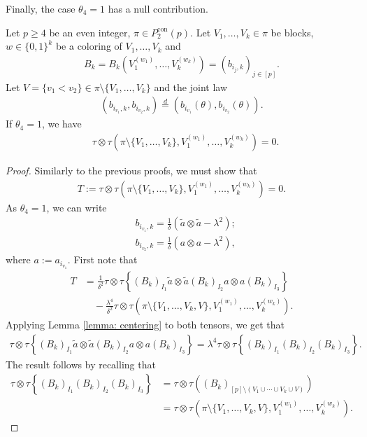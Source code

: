 \documentclass[12pt,reqno]{amsart}
\theoremstyle{plain}
\newcommand{\1}{\mathbf{1}}
\begin{document}
Finally, the case $\theta_4=1$ has a null contribution.
\begin{lemma}[Case $\theta_4=1$]\label{lemma: case theta_4=1}
    Let $p \ge 4$ be an even integer, $\pi \in P_2^{\operatorname{con}}(p)$. Let $V_1,\ldots,V_k \in \pi$ be blocks, $w \in \{0,1\}^k$ be a coloring of $V_1,\ldots,V_k$ and
    \begin{align*}
        B_k=B_k\left(V_1^{(w_1)},\ldots,V_k^{(w_k)}\right)=\left(b_{i_j,k}\right)_{j \in [p]}.
    \end{align*}
    Let $V=\{v_1<v_2\} \in \pi\setminus \{V_1,\ldots,V_{k}\}$ and the joint law 
    \begin{align*}
        \left(b_{i_{v_1},k},b_{i_{v_2},k}\right)\overset{d}{=}\left(b_{i_{v_1}}(\theta),b_{i_{v_2}}(\theta)\right).
    \end{align*}
    If $\theta_4=1$, we have
    \begin{align*}
        &\tau\otimes\tau \left(\pi\setminus \{V_1,\ldots,V_{k}\},V_1^{(w_1)},\ldots,V_{k}^{(w_{k})}\right)=0.
    \end{align*}
\end{lemma}
\begin{proof}
    Similarly to the previous proofs, we must show that
    \begin{align*}
        T:=\tau\otimes\tau \left(\pi\setminus \{V_1,\ldots,V_{k}\},V_1^{(w_1)},\ldots,V_{k}^{(w_{k})}\right) =0.
    \end{align*}
     As $\theta_4=1$, we can write
    \begin{align*}
        &b_{i_{v_1},k}=\frac{1}{\delta}\left(\tilde{a}\otimes \tilde{a}-\lambda^2\right);\\
        &b_{i_{v_2},k}=\frac{1}{\delta}\left(a\otimes a-\lambda^2\right),
    \end{align*}
    where $a:=a_{i_{v_1}}$. First note that
    \begin{align*}
        T&=\frac{1}{\delta^2}\tau\otimes \tau\left\{\left(B_k\right)_{I_1}\tilde{a}\otimes \tilde{a}\left(B_k\right)_{I_2}a\otimes a\left(B_k\right)_{I_3}\right\}\\
    &\quad-\frac{\lambda^4}{\delta^2}\tau\otimes \tau\left(\pi\setminus\{V_1,\ldots,V_k,V\},V_1^{(w_1)},\ldots,V_k^{(w_k)}\right).
    \end{align*}
    Applying Lemma \ref{lemma: centering} to both tensors, we get that
    \begin{align*}
        \tau\otimes \tau\left\{\left(B_k\right)_{I_1}\tilde{a}\otimes \tilde{a}\left(B_k\right)_{I_2}a\otimes a\left(B_k\right)_{I_3}\right\}=\lambda^4\tau\otimes \tau\left\{\left(B_k\right)_{I_1}\left(B_k\right)_{I_2}\left(B_k\right)_{I_3}\right\}.
    \end{align*}
    The result follows by recalling that
    \begin{align*}
        \tau\otimes \tau\left\{\left(B_k\right)_{I_1}\left(B_k\right)_{I_2}\left(B_k\right)_{I_3}\right\}&=\tau\otimes\tau \left(\left(B_k\right)_{[p]\setminus\left(V_1\cup \cdots \cup V_k \cup V\right)}\right)\\
        &=\tau\otimes \tau\left(\pi\setminus\{V_1,\ldots,V_k,V\},V_1^{(w_1)},\ldots,V_k^{(w_k)}\right).
    \end{align*}
\end{proof}
\end{document}
